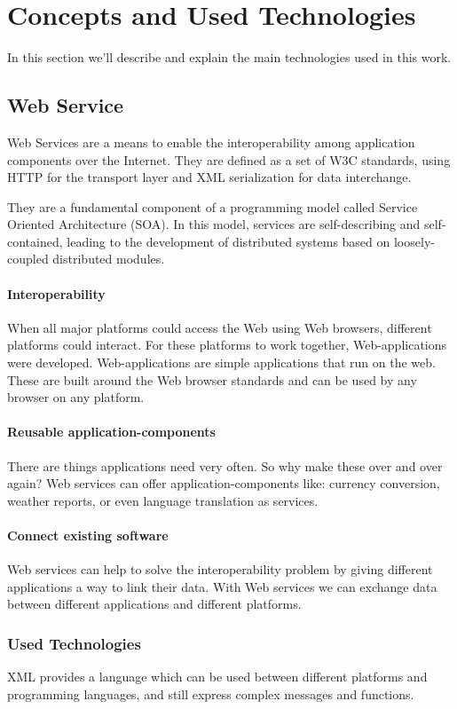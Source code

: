 \section{Concepts and Used Technologies}
In this section we'll describe and explain the main technologies used in this work.

\subsection{Web Service}
Web Services are a means to enable the interoperability among application components over the Internet.  They are defined as a set of W3C standards, using HTTP for the transport layer and XML serialization for data interchange.

They are  a fundamental component of a programming model called Service Oriented Architecture (SOA). In this model, services are self-describing and self-contained, leading to the development of distributed systems based on loosely-coupled distributed modules.

\paragraph{Interoperability}
When all major platforms could access the Web using Web browsers, different platforms could interact. For these platforms to work together, Web-applications were developed. Web-applications are simple applications that run on the web. These are built around the Web browser standards and can be used by any browser on any platform.

\paragraph{Reusable application-components}
There are things applications need very often. So why make these over and over again? Web services can offer application-components like: currency conversion, weather reports, or even language translation as services.

\paragraph{Connect existing software}
Web services can help to solve the interoperability problem by giving different applications a way to link their data. With Web services we can exchange data between different applications and different platforms. \citep{WST}

\subsubsection{Used Technologies}
XML provides a language which can be used between different platforms and programming languages, and still express complex messages and functions.

